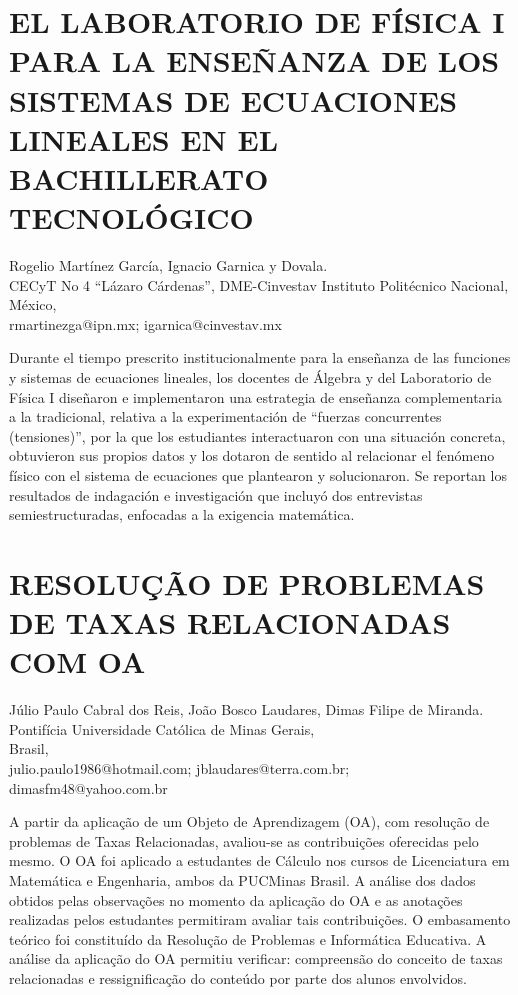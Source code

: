 \section{EL LABORATORIO DE FÍSICA I PARA LA ENSEÑANZA DE LOS SISTEMAS DE ECUACIONES
LINEALES EN EL BACHILLERATO TECNOLÓGICO}

\begin{datos}
Rogelio Martínez García, Ignacio Garnica y Dovala. \\
CECyT No 4 “Lázaro Cárdenas”, DME-Cinvestav Instituto Politécnico Nacional, \\
\hfill México, \\
 \hfill rmartinezga@ipn.mx; igarnica@cinvestav.mx 
\end{datos}

Durante el tiempo prescrito institucionalmente para la enseñanza de
las funciones y sistemas de ecuaciones lineales, los docentes de Álgebra
y del Laboratorio de Física I diseñaron e implementaron una estrategia
de enseñanza complementaria a la tradicional, relativa a la experimentación
de “fuerzas concurrentes (tensiones)”, por la que los estudiantes
interactuaron con una situación concreta, obtuvieron sus propios datos
y los dotaron de sentido al relacionar el fenómeno físico con el sistema
de ecuaciones que plantearon y solucionaron. Se reportan los resultados
de indagación e investigación que incluyó dos entrevistas semiestructuradas,
enfocadas a la exigencia matemática. 


\section{RESOLUÇÃO DE PROBLEMAS DE TAXAS RELACIONADAS COM OA}

\begin{datos}
Júlio Paulo Cabral dos Reis, João Bosco Laudares, Dimas Filipe de Miranda. \\
Pontifícia Universidade Católica de Minas Gerais, \\
\hfill Brasil, \\
 \hfill  julio.paulo1986@hotmail.com; jblaudares@terra.com.br;\\
\hfill dimasfm48@yahoo.com.br 
\end{datos}

A partir da aplicação de um Objeto de Aprendizagem (OA), com resolução
de problemas de Taxas Relacionadas, avaliou-se as contribuições oferecidas
pelo mesmo. O OA foi aplicado a estudantes de Cálculo nos cursos de
Licenciatura em Matemática e Engenharia, ambos da PUCMinas Brasil.
A análise dos dados obtidos pelas observações no momento da aplicação
do OA e as anotações realizadas pelos estudantes permitiram avaliar
tais contribuições. O embasamento teórico foi constituído da Resolução
de Problemas e Informática Educativa. A análise da aplicação do OA
permitiu verificar: compreensão do conceito de taxas relacionadas
e ressignificação do conteúdo por parte dos alunos envolvidos. 


